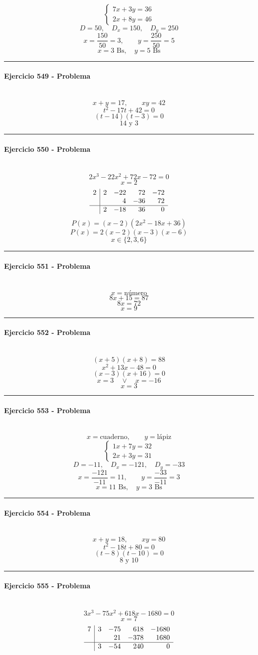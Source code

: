 \documentclass[10pt,a4paper]{article}
\newcommand{\res}[1]{\paragraph{#1}\mbox{}\\[-1.2em]}
\begin{document}
\[ \begin{cases}7x+3y=36\\2x+8y=46\end{cases} \]
\[ D=50,\quad D_x=150,\quad D_y=250 \]
\[ x=\frac{150}{50}=3,\qquad y=\frac{250}{50}=5 \]
\[ \boxed{x=3\text{ Bs},\quad y=5\text{ Bs}} \]
\vspace{1mm}\hrule\vspace{2mm}
\res{Ejercicio 549 - Problema}
\[ x+y=17,\qquad xy=42 \]
\[ t^2-17t+42=0 \]
\[ (t-14)(t-3)=0 \]
\[ \boxed{14\text{ y }3} \]
\vspace{1mm}\hrule\vspace{2mm}
\res{Ejercicio 550 - Problema}
\[ 2 x^{3} - 22 x^{2} + 72 x - 72=0 \]
\[ x=2 \]
\[\begin{array}{r|rrrr}2 & 2 & -22 & 72 & -72\\  &  & 4 & -36 & 72\\\hline  & 2 & -18 & 36 & 0\end{array}\]
\[ P(x)=(x-2)(2 x^{2} - 18 x + 36) \]
\[ P(x)=2(x-2)(x-3)(x-6) \]
\[ \boxed{x\in\{2,3,6\}} \]
\vspace{1mm}\hrule\vspace{2mm}
\res{Ejercicio 551 - Problema}
\[ x=\text{número} \]
\[ 8x+15=87 \]
\[ 8x=72 \]
\[ \boxed{x=9} \]
\vspace{1mm}\hrule\vspace{2mm}
\res{Ejercicio 552 - Problema}
\[ (x+5)(x+8)=88 \]
\[ x^{2} + 13 x - 48=0 \]
\[ (x-3)(x+16)=0 \]
\[ x=3\quad \vee \quad x=-16 \]
\[ \boxed{x=3} \]
\vspace{1mm}\hrule\vspace{2mm}
\res{Ejercicio 553 - Problema}
\[ x=\text{cuaderno},\qquad y=\text{lápiz} \]
\[ \begin{cases}1x+7y=32\\2x+3y=31\end{cases} \]
\[ D=-11,\quad D_x=-121,\quad D_y=-33 \]
\[ x=\frac{-121}{-11}=11,\qquad y=\frac{-33}{-11}=3 \]
\[ \boxed{x=11\text{ Bs},\quad y=3\text{ Bs}} \]
\vspace{1mm}\hrule\vspace{2mm}
\res{Ejercicio 554 - Problema}
\[ x+y=18,\qquad xy=80 \]
\[ t^2-18t+80=0 \]
\[ (t-8)(t-10)=0 \]
\[ \boxed{8\text{ y }10} \]
\vspace{1mm}\hrule\vspace{2mm}
\res{Ejercicio 555 - Problema}
\[ 3 x^{3} - 75 x^{2} + 618 x - 1680=0 \]
\[ x=7 \]
\[\begin{array}{r|rrrr}7 & 3 & -75 & 618 & -1680\\  &  & 21 & -378 & 1680\\\hline  & 3 & -54 & 240 & 0\end{array}\]
\end{document}
